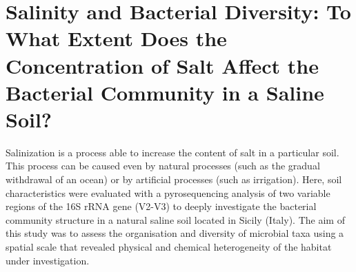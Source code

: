 \newpage

\newpage

\section[Salinity and Bacterial Diversity: To What Extent Does the Concentration of Salt Affect the Bacterial Community in a Saline Soil?]{Salinity and Bacterial Diversity: To What Extent Does the Concentration of Salt Affect the Bacterial Community in a Saline Soil?%
}

Salinization is a process able to increase the content of salt in a particular soil. This process can be caused even by natural processes (such as the gradual withdrawal of an ocean) or by artificial processes (such as irrigation). Here, soil characteristics were evaluated with a pyrosequencing analysis of two variable regions of the 16S rRNA gene (V2-V3) to deeply investigate the bacterial community structure in a natural saline soil located in Sicily (Italy). The aim of this study was to assess the organisation and diversity of microbial taxa using a spatial scale that revealed physical and chemical heterogeneity of the habitat under investigation.\\

\newpage

\newpage


\backmatter
{}
\renewcommand{\sectionmark}[1]{\markright{#1}}
\sectionmark{Bibliography}
